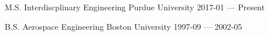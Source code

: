 


\begin{cventries}

  \cventry
    {M.S. Interdiscplinary Engineering} %
    {Purdue University} %
    {} %
    {2017-01 — Present} %
    {}


  \cventry
    {B.S. Aerospace Engineering} %
    {Boston University} %
    {} %
    {1997-09 — 2002-05} %
    {}


\end{cventries}

